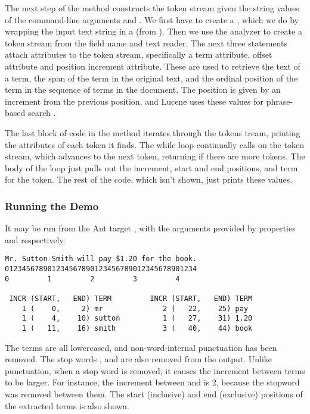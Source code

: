 The next step of the  method constructs the token stream
given the string values of the command-line arguments 
and .  
%
%
We first have to create a , which we do by wrapping the
input text string in a  (from ).
Then we use the analyzer to create a token stream from the field name
and text reader.  The next three statements attach attributes to the
token stream, specifically a term attribute, offset attribute and
position increment attribute.  These are used to retrieve the text of
a term, the span of the term in the original text, and the ordinal
position of the term in the sequence of terms in the document.  The
position is given by an increment from the previous position, and
Lucene uses these values for phrase-based search .

The last block of code in the  method iterates through
the tokens tream, printing the attributes of each token it finds.
%
%
The while loop continually calls  on the token
stream, which advances to the next token, returning  if
there are more tokens.  The body of the loop just pulls out the
increment, start and end positions, and term for the token.  The
rest of the code, which isn't shown, just prints these values.

\subsubsection{Running the Demo}

It may be run from the Ant target , with
the arguments provided by properties  and 
 respectively.

\begin{verbatim}
Mr. Sutton-Smith will pay $1.20 for the book.
012345678901234567890123456789012345678901234
0         1         2         3         4

 INCR (START,   END) TERM         INCR (START,   END) TERM
    1 (    0,     2) mr              2 (   22,    25) pay
    1 (    4,    10) sutton          1 (   27,    31) 1.20
    1 (   11,    16) smith           3 (   40,    44) book
\end{verbatim}
%
The terms are all lowercased, and non-word-internal punctuation has
been removed.  The stop words , 
and  are also removed from the output.  Unlike
punctuation, when a stop word is removed, it causes the increment
between terms to be larger.  For instance, the increment between
 and  is 2, because the stopword
 was removed between them.  The start (inclusive)
and end (exclusive) positions of the extracted terms is also shown.


